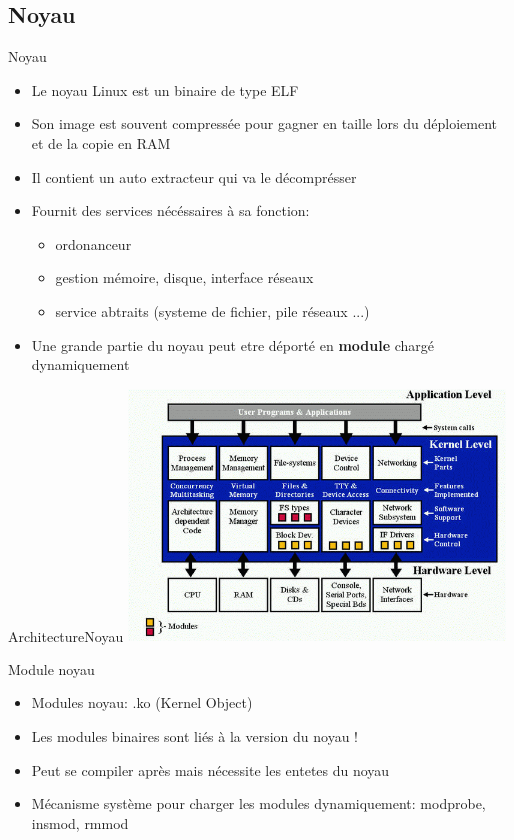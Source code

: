 \subsection{Noyau}
\begin{frame}{Noyau}{}
  \begin{itemize}
  \item Le noyau Linux est un binaire de type ELF
  \item Son image est souvent compressée pour gagner en taille lors du déploiement et de la copie en RAM
  \item Il contient un auto extracteur qui va le décomprésser
  \item Fournit des services nécéssaires à sa fonction:
    \begin{itemize}
    \item ordonanceur
    \item gestion mémoire, disque, interface réseaux
    \item service abtraits (systeme de fichier, pile réseaux ...)
    \end{itemize}
  \item Une grande partie du noyau peut etre déporté en \textbf{module} chargé dynamiquement
  \end{itemize}
\end{frame}

\begin{frame}{Architecture}{Noyau}
  \includegraphics[width=10cm]{pictures/kernel_arch.png}
\end{frame}

\begin{frame}{Module noyau}
  \begin{itemize}
  \item Modules noyau: .ko (Kernel Object)
  \item Les modules binaires sont liés à la version du noyau !
  \item Peut se compiler après mais nécessite les entetes du noyau
  \item Mécanisme système pour charger les modules dynamiquement: modprobe, insmod, rmmod
  \end{itemize}
\end{frame}

